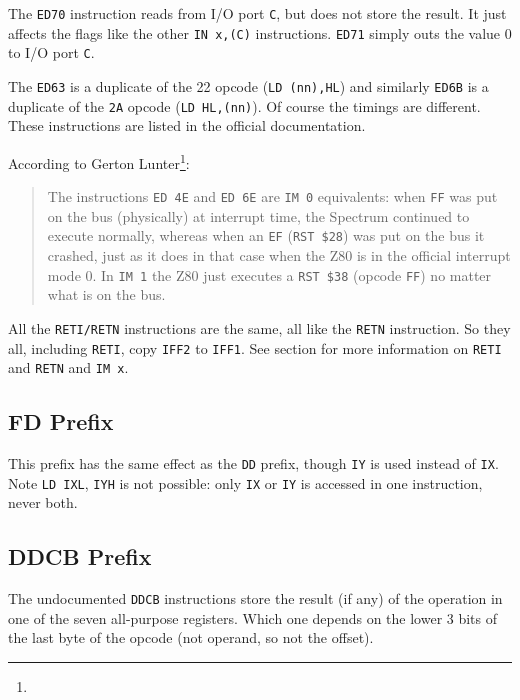 The {\tt ED70} instruction reads from I/O port {\tt C}, but does not store the result. It just affects the flags like the other {\tt IN x,(C)} instructions. {\tt ED71} simply outs the value 0 to I/O port {\tt C}.

The {\tt ED63} is a duplicate of the 22 opcode ({\tt LD (nn),HL}) and similarly {\tt ED6B} is a duplicate of the {\tt 2A} opcode ({\tt LD HL,(nn)}). Of course the timings are different. These instructions are listed in the official documentation.

\pagebreak
According to Gerton Lunter\footnote{}:

\begin{quote}
	The instructions {\tt ED 4E} and {\tt ED 6E} are {\tt IM 0} equivalents: when {\tt FF} was put on the bus (physically) at interrupt time, the Spectrum continued to execute normally, whereas when an {\tt EF} ({\tt RST \$28}) was put on the bus it crashed, just as it does in that case when the Z80 is in the official interrupt mode 0. In {\tt IM 1} the Z80 just executes a {\tt RST \$38} (opcode {\tt FF}) no matter what is on the bus.
\end{quote}

All the {\tt RETI/RETN} instructions are the same, all like the {\tt RETN} instruction. So they all, including {\tt RETI}, copy {\tt IFF2} to {\tt IFF1}. See section  for more information on {\tt RETI} and {\tt RETN} and {\tt IM x}.


\subsection{FD Prefix \cite{gerton}}

This prefix has the same effect as the {\tt DD} prefix, though {\tt IY} is used instead of {\tt IX}.  Note {\tt LD IXL}, {\tt IYH} is not possible: only {\tt IX} or {\tt IY} is accessed in one instruction, never both.


\subsection{DDCB Prefix}
\label{z80_undocumented_prefix_cbdd}

The undocumented {\tt DDCB} instructions store the result (if any) of the operation in one of the seven all-purpose registers. Which one depends on the lower 3 bits of the last byte of the opcode (not operand, so not the offset).


